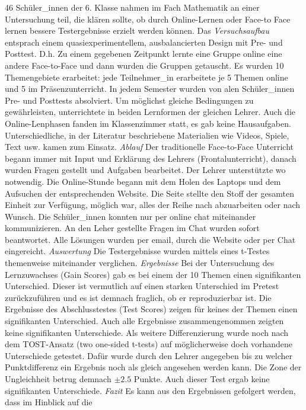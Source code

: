 \documentclass[12pt, bibliography=totoc]{scrartcl}
\begin{document}
46 Schüler\_innen der 6. Klasse nahmen im Fach Mathematik an einer
Untersuchung teil, die klären sollte, ob durch Online-Lernen oder
Face-to Face lernen bessere Testergebnisse erzielt werden können. Das
\emph{Versuchsaufbau} entsprach einem quasiexperimentellem,
ausbalancierten Design mit Pre- und Posttest. D.h. Zu einem gegebenen
Zeitpunkt lernte eine Gruppe online eine andere Face-to-Face und dann
wurden die Gruppen getauscht. Es wurden 10 Themengebiete erarbeitet:
jede Teilnehmer\_in erarbeitete je 5 Themen online und 5 im
Präsenzunterricht. In jedem Semester wurden von alen Schüler\_innen Pre-
und Posttests absolviert. Um möglichst gleiche Bedingungen zu
gewährleisten, unterrichtete in beiden Lernformen der gleichen Lehrer.
Auch die Online-Lenphasen fanden im Klassenzimmer statt, es gab keine
Hausaufgaben. Unterschiedliche, in der Literatur beschriebene
Materialien wie Videos, Spiele, Text usw. kamen zum Einsatz.
\emph{Ablauf} Der traditionelle Face-to-Face Unterricht begann immer mit
Input und Erklärung des Lehrers (Frontalunterricht), danach wurden
Fragen gestellt und Aufgaben bearbeitet. Der Lehrer unterstützte wo
notwendig. Die Online-Stunde begann mit dem Holen des Laptops und dem
Aufsuchen der entsprechenden Website. Die Seite stellte den Stoff der
gesamten Einheit zur Verfügung, möglich war, alles der Reihe nach
abzuarbeiten oder nach Wunsch. Die Schüler\_innen konnten nur per online
chat miteinander kommunizieren. An den Leher gestellte Fragen im Chat
wurden sofort beantwortet. Alle Lösungen wurden per email, durch die
Website oder per Chat eingereicht. \emph{Auswertung} Die Testergebnisse
wurden mittels eines t-Testes themenweise miteinander verglichen.
\emph{Ergebnisse} Bei der Untersuchung des Lernzuwachses (Gain Scores)
gab es bei einem der 10 Themen einen signifikanten Unterschied. Dieser
ist vermutlich auf einen starken Unterschied im Pretest zurückzuführen
und es ist demnach fraglich, ob er reproduzierbar ist. Die Ergebnisse
des Abschlusstestes (Test Scores) zeigen für keines der Themen einen
signifikanten Unterschied. Auch alle Ergebnisse zusammengenommen zeigten
keine signifikanten Unterschiede. Als weitere Differenzierung wurde noch
nach dem TOST-Ansatz (two one-sided t-tests) auf möglicherweise doch
vorhandene Unterschiede getestet. Dafür wurde durch den Lehrer angegeben
bis zu welcher Punktdifferenz ein Ergebnis noch als gleich angesehen
werden kann. Die Zone der Ungleichheit betrug demnach \(\pm2.5\) Punkte.
Auch dieser Test ergab keine signifikanten Unterschiede. \emph{Fazit} Es
kann aus den Ergebnissen gefolgert werden, dass im Hinblick auf die
\end{document}
